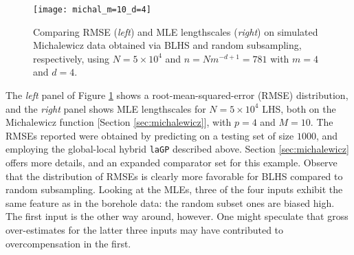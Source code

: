 \documentclass[12pt]{article}
\begin{document}

\begin{figure}[ht!]
\centering
\texttt{[image: michal\_m=10\_d=4]}
\vspace{-0.4cm}
\caption{Comparing RMSE ({\em left}) and MLE lengthscales ({\em right}) on
simulated Michalewicz data obtained via BLHS and random subsampling,
respectively, using $N=5\times 10^4$ and $n=Nm^{-d+1}=781$ with $m=4$ and $d=4$.}
\label{f:michal}
\end{figure}

The {\em left} panel of Figure \ref{f:michal} shows a root-mean-squared-error
(RMSE) distribution, and the {\em right} panel shows MLE lengthscales for
$N=5\times 10^4$ LHS, both on the Michalewicz function [Section
\ref{sec:michalewicz}], with $p=4$ and $M=10$.  The RMSEs reported were
obtained by predicting on a testing set of size $1000$, and employing the
global-local hybrid {\tt laGP} described above. Section \ref{sec:michalewicz} offers
more details, and an expanded comparator set for this example. Observe that
the distribution of RMSEs is clearly more favorable for BLHS compared to
random subsampling.  Looking at the MLEs, three of the four inputs exhibit the
same feature as in the borehole data: the random subset ones are biased high.
The first input is the other way around, however. One might speculate that
gross over-estimates for the latter three inputs may have contributed to
overcompensation in the first. 
\end{document}
